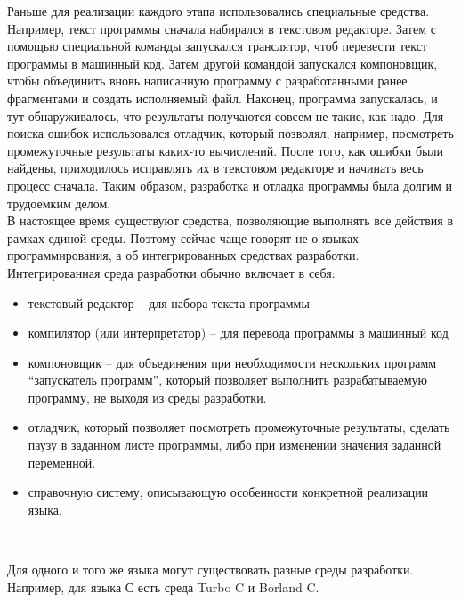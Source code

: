 
Раньше для реализации каждого этапа использовались специальные средства. Например, текст программы сначала набирался в текстовом редакторе. Затем с помощью специальной команды запускался транслятор, чтоб перевести текст программы в машинный код. Затем другой командой запускался компоновщик, чтобы объединить вновь написанную программу с разработанными ранее фрагментами и создать исполняемый файл. Наконец, программа запускалась, и тут обнаруживалось, что результаты получаются совсем не такие, как надо. Для поиска ошибок использовался отладчик, который позволял, например, посмотреть промежуточные результаты каких-то вычислений. После того, как ошибки были найдены, приходилось исправлять их в текстовом редакторе и начинать весь процесс сначала. Таким образом, разработка и отладка программы была долгим и трудоемким делом. \\

В настоящее время существуют средства, позволяющие выполнять все действия в рамках единой среды. Поэтому сейчас чаще говорят не о языках программирования, а об интегрированных средствах разработки. \\

Интегрированная среда разработки обычно включает в себя: \\

\begin{itemize}
  \item текстовый редактор – для набора текста программы
  \item компилятор (или интерпретатор) – для перевода программы в машинный код
  \item компоновщик – для объединения при необходимости нескольких программ “запускатель программ”, который позволяет выполнить разрабатываемую программу, не выходя из среды разработки.
  \item отладчик, который позволяет посмотреть промежуточные результаты, сделать паузу в заданном листе программы, либо при изменении значения заданной переменной.
  \item справочную систему, описывающую особенности конкретной реализации языка.
\end{itemize}
\

Для одного и того же языка могут существовать разные среды разработки. Например, для языка С есть среда Turbo C и Borland C. \\


